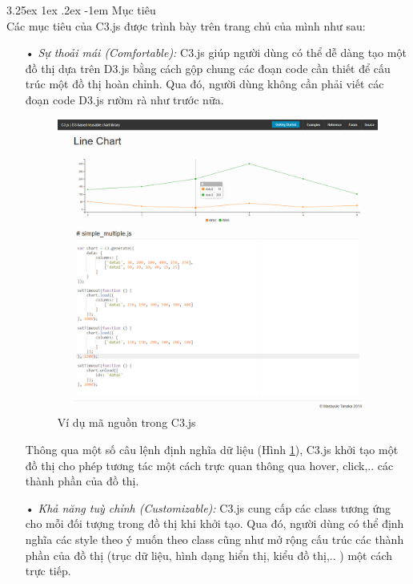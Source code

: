\documentclass[12pt,a4paper,twoside]{article}
\makeatletter
\newcommand{\myparagraph}[1]{\paragraph{#1}\mbox{}\\} %
\renewcommand\paragraph{\@startsection{paragraph}{5}{\z@}%
  {3.25ex \@plus1ex \@minus.2ex}%
  {-1em}%
  {\normalfont\normalsize\bfseries}}
\makeatother
\begin{document}
\myparagraph{Mục tiêu}
Các mục tiêu của C3.js được trình bày trên trang chủ của mình như sau:
\begin{itemize}
\item[•] \emph{Sự thoải mái (Comfortable):} C3.js giúp người dùng có thể dễ dàng tạo một đồ thị dựa trên D3.js bằng cách gộp chung các đoạn code cần thiết để cấu trúc một đồ thị hoàn chỉnh. Qua đó, người dùng không cần phải viết các đoạn code D3.js rườm rà như trước nữa.
    
\begin{figure}[!h]
	\begin{center}
    \includegraphics[scale=.3]{image/c3syntax}
    \caption{Ví dụ mã nguồn trong C3.js}
    \label{fig:c3syntax}
	\end{center}
\end{figure}

Thông qua một số câu lệnh định nghĩa dữ liệu (Hình \ref{fig:c3syntax}), C3.js khởi tạo một đồ thị cho phép tương tác một cách trực quan thông qua hover, click,.. các thành phần của đồ thị.

\item[•] \emph{Khả năng tuỳ chỉnh (Customizable):} C3.js cung cấp các class tương ứng cho mỗi đối tượng trong đồ thị khi khởi tạo. Qua đó, người dùng có thể định nghĩa các style theo ý muốn theo class cũng như mở rộng cấu trúc các thành phần của đồ thị (trục dữ liệu, hình dạng hiển thị, kiểu đồ thị,.. ) một cách trực tiếp.
    

\end{itemize}
\end{document}
